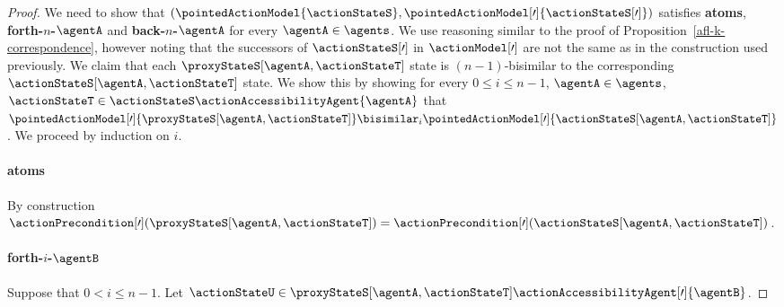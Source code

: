\documentclass[twoside]{aiml14}
\begin{document}
\begin{proof}
      We need to show that $(\pointedActionModel{\actionStateS}, \pointedActionModel[\prime]{\actionStateS[\prime]})$ 
      satisfies {\bf atoms}, {\bf forth-$n$-$\agentA$} and {\bf back-$n$-$\agentA$} 
      for every $\agentA \in \agents$.
      We use reasoning similar to the proof of Proposition~\ref{afl-k-correspondence}, 
      however noting that the successors of $\actionStateS[\prime]$ in
      $\actionModel[\prime]$ are not the same as in the construction used
      previously.
      We claim that each $\proxyStateS[\agentA,\actionStateT]$
      state is $(n-1)$-bisimilar to the corresponding $\actionStateS[\agentA,\actionStateT]$ state.
      We show this by showing for every $0 \leq i \leq n - 1$, 
      $\agentA \in \agents$,
      $\actionStateT \in \actionStateS \actionAccessibilityAgent{\agentA}$ that 
      $\pointedActionModel[\prime]{\proxyStateS[\agentA,\actionStateT]} \bisimilar_i \pointedActionModel[\prime]{\actionStateS[\agentA,\actionStateT]}$.
      We proceed by induction on $i$.

      \paragraph{atoms} By construction $\actionPrecondition[\prime](\proxyStateS[\agentA, \actionStateT]) = \actionPrecondition[\prime](\actionStateS[\agentA,\actionStateT])$.

      \paragraph{forth-$i$-$\agentB$} Suppose that $0 < i \leq n - 1$. Let $\actionStateU \in \proxyStateS[\agentA,\actionStateT] \actionAccessibilityAgent[\prime]{\agentB}$. 
      

\end{proof}
\end{document}
